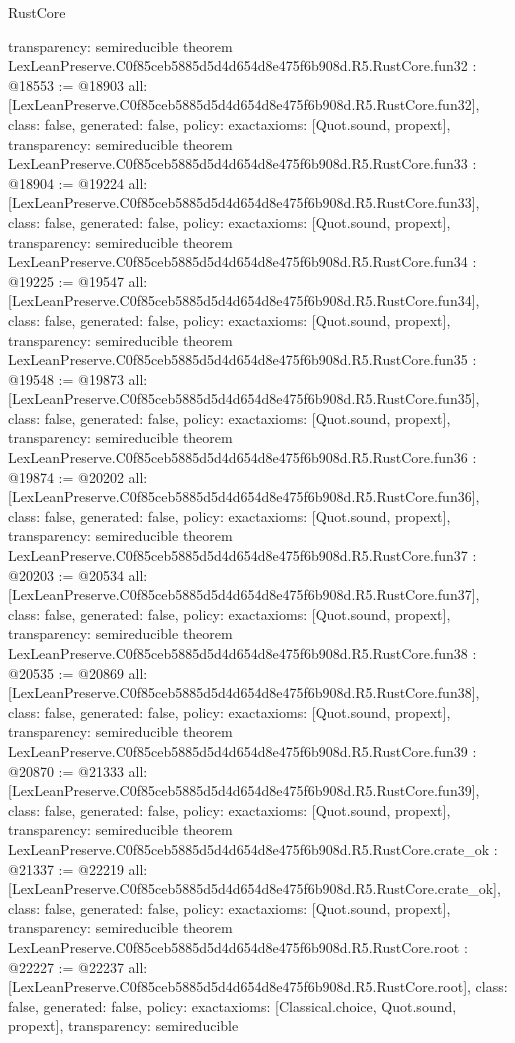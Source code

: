 \begin{lexlean}{RustCore}
\begin{coremodule}
{  transparency: semireducible
}
theorem LexLeanPreserve.C0f85ceb5885d5d4d654d8e475f6b908d.R5.RustCore.fun32 : @18553 := @18903 {
  all: [LexLeanPreserve.C0f85ceb5885d5d4d654d8e475f6b908d.R5.RustCore.fun32],
  class: false,
  generated: false,
  policy: exact{axioms: [Quot.sound, propext]},
  transparency: semireducible
}
theorem LexLeanPreserve.C0f85ceb5885d5d4d654d8e475f6b908d.R5.RustCore.fun33 : @18904 := @19224 {
  all: [LexLeanPreserve.C0f85ceb5885d5d4d654d8e475f6b908d.R5.RustCore.fun33],
  class: false,
  generated: false,
  policy: exact{axioms: [Quot.sound, propext]},
  transparency: semireducible
}
theorem LexLeanPreserve.C0f85ceb5885d5d4d654d8e475f6b908d.R5.RustCore.fun34 : @19225 := @19547 {
  all: [LexLeanPreserve.C0f85ceb5885d5d4d654d8e475f6b908d.R5.RustCore.fun34],
  class: false,
  generated: false,
  policy: exact{axioms: [Quot.sound, propext]},
  transparency: semireducible
}
theorem LexLeanPreserve.C0f85ceb5885d5d4d654d8e475f6b908d.R5.RustCore.fun35 : @19548 := @19873 {
  all: [LexLeanPreserve.C0f85ceb5885d5d4d654d8e475f6b908d.R5.RustCore.fun35],
  class: false,
  generated: false,
  policy: exact{axioms: [Quot.sound, propext]},
  transparency: semireducible
}
theorem LexLeanPreserve.C0f85ceb5885d5d4d654d8e475f6b908d.R5.RustCore.fun36 : @19874 := @20202 {
  all: [LexLeanPreserve.C0f85ceb5885d5d4d654d8e475f6b908d.R5.RustCore.fun36],
  class: false,
  generated: false,
  policy: exact{axioms: [Quot.sound, propext]},
  transparency: semireducible
}
theorem LexLeanPreserve.C0f85ceb5885d5d4d654d8e475f6b908d.R5.RustCore.fun37 : @20203 := @20534 {
  all: [LexLeanPreserve.C0f85ceb5885d5d4d654d8e475f6b908d.R5.RustCore.fun37],
  class: false,
  generated: false,
  policy: exact{axioms: [Quot.sound, propext]},
  transparency: semireducible
}
theorem LexLeanPreserve.C0f85ceb5885d5d4d654d8e475f6b908d.R5.RustCore.fun38 : @20535 := @20869 {
  all: [LexLeanPreserve.C0f85ceb5885d5d4d654d8e475f6b908d.R5.RustCore.fun38],
  class: false,
  generated: false,
  policy: exact{axioms: [Quot.sound, propext]},
  transparency: semireducible
}
theorem LexLeanPreserve.C0f85ceb5885d5d4d654d8e475f6b908d.R5.RustCore.fun39 : @20870 := @21333 {
  all: [LexLeanPreserve.C0f85ceb5885d5d4d654d8e475f6b908d.R5.RustCore.fun39],
  class: false,
  generated: false,
  policy: exact{axioms: [Quot.sound, propext]},
  transparency: semireducible
}
theorem LexLeanPreserve.C0f85ceb5885d5d4d654d8e475f6b908d.R5.RustCore.crate_ok : @21337 := @22219 {
  all: [LexLeanPreserve.C0f85ceb5885d5d4d654d8e475f6b908d.R5.RustCore.crate_ok],
  class: false,
  generated: false,
  policy: exact{axioms: [Quot.sound, propext]},
  transparency: semireducible
}
theorem LexLeanPreserve.C0f85ceb5885d5d4d654d8e475f6b908d.R5.RustCore.root : @22227 := @22237 {
  all: [LexLeanPreserve.C0f85ceb5885d5d4d654d8e475f6b908d.R5.RustCore.root],
  class: false,
  generated: false,
  policy: exact{axioms: [Classical.choice, Quot.sound, propext]},
  transparency: semireducible
}


\end{coremodule}
\end{lexlean}
